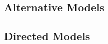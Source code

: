     
\subsection{Alternative Models}

    

\subsection{Directed Models}\label{sec:mdev-directed}

    